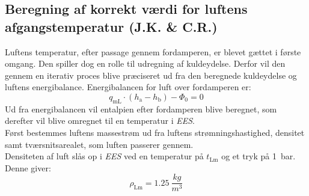 \documentclass[../Hovedrapport.tex]{subfiles}
\begin{document}
\subsection{Beregning af korrekt værdi for luftens afgangstemperatur  (J.K. \& C.R.)}
\label{sec:afgangstemp_fordamp}
Luftens temperatur, efter passage gennem fordamperen, er blevet gættet i første omgang. Den spiller dog en rolle til udregning af kuldeydelse. Derfor vil den gennem en iterativ proces blive præciseret ud fra den beregnede kuldeydelse og luftens energibalance. Energibalancen for luft over fordamperen er:
\begin{equation}
    q_\text{mL} \cdot (h_\text{a} - h_\text{b}) - \Phi_0 = 0
    \label{eq:energibalance_luft_fordamper}
\end{equation}
Ud fra energibalancen vil entalpien efter fordamperen blive beregnet, som derefter vil blive omregnet til en temperatur i \textit{EES}.\\
Først bestemmes luftens massestrøm ud fra luftens strømningshastighed, densitet samt tværsnitsarealet, som luften passerer gennem.\\
Densiteten af luft slås op i \textit{EES} ved en temperatur på $t_\text{Lm}$ og et tryk på \SI{1}{bar}. Denne giver:
\begin{equation*}
    \rho_\text{Lm} = \SI{1,25}{\frac{kg}{m^3}}
\end{equation*}
\end{document}
